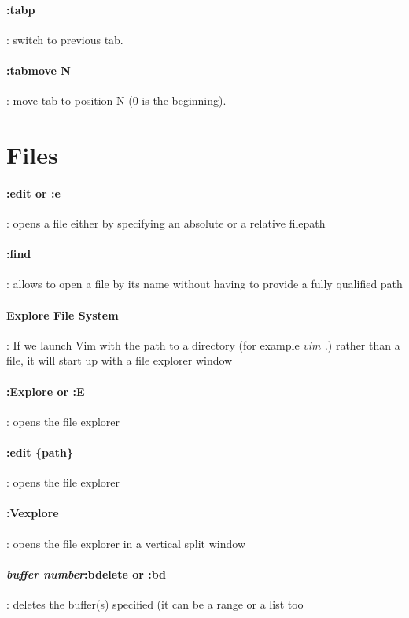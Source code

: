 \documentclass[10pt,letterpaper]{book}
\begin{document}
\paragraph{:tabp}: switch to previous tab.
\paragraph{:tabmove N}: move tab to position N (0 is the beginning).

\section{Files}
\paragraph{:edit or :e}: opens a file either by specifying
an absolute or a relative filepath
\paragraph{:find}: allows to open a file by its name without having to provide a fully qualified path
\paragraph{Explore File System}: If we launch Vim with the path to a directory (for example \textit{vim .}) rather than a file, it will start up with a file explorer window
\paragraph{:Explore or :E}: opens the file explorer
\paragraph{:edit \{path\}}: opens the file explorer
\paragraph{:Vexplore}: opens the file explorer in a vertical split window
\paragraph{\textit{buffer number}:bdelete or :bd}: deletes the buffer(s) specified (it can be a range or a list too
\end{document}
